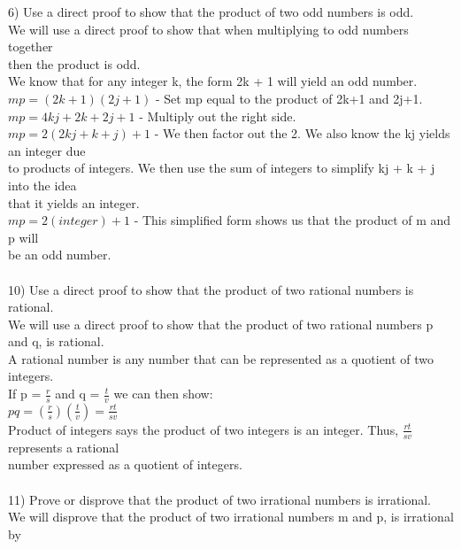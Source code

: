 \documentclass{article}
\begin{document}
\begin{flushleft}
\setlength\parindent{0pt}6) Use a direct proof to show that the product of two odd numbers is odd. \\
\setlength\parindent{24pt} We will use a direct proof to show that when multiplying to odd numbers together\\
 then the product is odd. \\
\setlength\parindent{24pt} We know that for any integer k, the form 2k + 1 will yield an odd number. \\
\setlength\parindent{24pt} $mp = (2k + 1)(2j + 1)$ - Set mp equal to the product of 2k+1 and 2j+1. \\
\setlength\parindent{24pt} $mp = 4kj + 2k + 2j +1$ - Multiply out the right side. \\
\setlength\parindent{24pt} $mp = 2(2kj + k + j) + 1$ - We then factor out the 2.  We also know the kj yields an integer due\\
 to products of integers.  We then use the sum of integers to simplify kj + k + j into the idea \\
 that it yields an integer. \\ 
\setlength\parindent{24pt} $mp = 2(integer) + 1$ - This simplified form shows us that the product of m and p will \\
be an odd number.\\
~\\
\setlength\parindent{0pt}10) Use a direct proof to show that the product of two rational numbers is rational. \\
\setlength\parindent{24pt} We will use a direct proof to show that the product of two rational numbers p and q, is rational.\\
\setlength\parindent{24pt} A rational number is any number that can be represented as a quotient of two integers.  \\
\setlength\parindent{24pt} If p = $\frac{r}{s}$ and q = $\frac{t}{v}$ we can then show: \\
\setlength\parindent{24pt}$pq = (\frac{r}{s})(\frac{t}{v}) = \frac{rt}{sv}$ \\
\setlength\parindent{24pt} Product of integers says the product of two integers is an integer.  Thus, $\frac{rt}{sv}$ represents a rational\\
 number expressed as a quotient of integers.\\
~\\
\setlength\parindent{0pt}11) Prove or disprove that the product of two irrational numbers is irrational. \\
\setlength\parindent{24pt} We will disprove that the product of two irrational numbers m and p, is irrational by \\

\end{flushleft}
\end{document}
